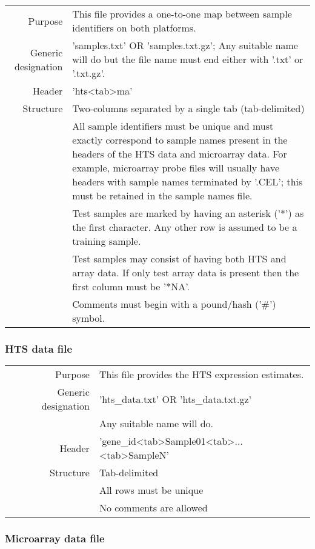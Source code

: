 \documentclass[a4paper,12pt]{article}
\begin{document}
\begin{tabular}{rp{12cm}}
Purpose & This file provides a one-to-one map between sample identifiers on both platforms. \\
Generic designation & 'samples.txt' OR 'samples.txt.gz'; Any suitable name will do but the file name must end either with '.txt' or '.txt.gz'. \\
Header & 'hts\textless tab\textgreater ma' \\
Structure & Two-columns separated by a single tab (tab-delimited) \\
  & All sample identifiers must be unique and must exactly correspond to sample names present in the headers of the HTS data and microarray data. For example, microarray probe files will usually have headers with sample names terminated by '.CEL'; this must be retained in the sample names file. \\
  & Test samples are marked by having an asterisk ('*') as the first character. Any other row is assumed to be a training sample. \\
  & Test samples may consist of having both HTS and array data. If only test array data is present then the first column must be '*NA'. \\
  & Comments must begin with a pound/hash ('\#') symbol. \\
\end{tabular}

\subsubsection{HTS data file}
\label{gep:hts}

\begin{tabular}{rp{12cm}}
Purpose & This file provides the HTS expression estimates.\\
Generic designation & 'hts\_data.txt' OR 'hts\_data.txt.gz' \\
  & Any suitable name will do. \\
Header & 'gene\_id\textless tab\textgreater Sample01\textless tab\textgreater...\textless tab\textgreater SampleN' \\
Structure & Tab-delimited \\
  & All rows must be unique \\
  & No comments are allowed \\
\end{tabular}

\subsubsection{Microarray data file}
\label{gep:microarray}
\end{document}
